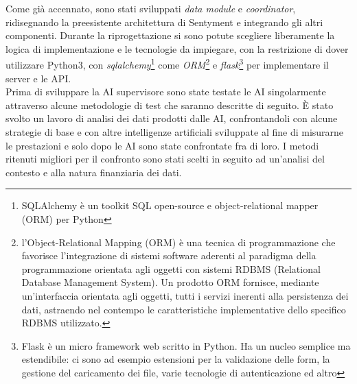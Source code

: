 \documentclass[a4paper,12pt]{report}
\begin{document}
Come già accennato, sono stati sviluppati \textit{data module} e \textit{coordinator}, ridisegnando la preesistente architettura di Sentyment e integrando gli altri componenti. Durante la riprogettazione si sono potute scegliere liberamente la logica di implementazione e le tecnologie da impiegare, con la restrizione di dover utilizzare Python3, con \textit{sqlalchemy}\footnote{SQLAlchemy è un toolkit SQL open-source e object-relational mapper (ORM) per Python} come \textit{ORM}\footnote{l'Object-Relational Mapping (ORM) è una tecnica di programmazione che favorisce l'integrazione di sistemi software aderenti al paradigma della programmazione orientata agli oggetti con sistemi RDBMS (Relational Database Management System). Un prodotto ORM fornisce, mediante un'interfaccia orientata agli oggetti, tutti i servizi inerenti alla persistenza dei dati, astraendo nel contempo le caratteristiche implementative dello specifico RDBMS utilizzato.} e \textit{flask}\footnote{Flask è un micro framework web scritto in Python. Ha un nucleo semplice ma estendibile: ci sono ad esempio estensioni per la validazione delle form, la gestione del caricamento dei file, varie tecnologie di autenticazione ed altro} per implementare il server e le API.\\
Prima di sviluppare la AI supervisore sono state testate le AI singolarmente attraverso alcune metodologie di test che saranno descritte di seguito. È stato svolto un lavoro di analisi dei dati prodotti dalle AI, confrontandoli con alcune strategie di base e con altre intelligenze artificiali sviluppate al fine di misurarne le prestazioni e solo dopo le AI sono state confrontate fra di loro. I metodi ritenuti migliori per il confronto sono stati scelti in seguito ad un'analisi del contesto e alla natura finanziaria dei dati.
\end{document}
